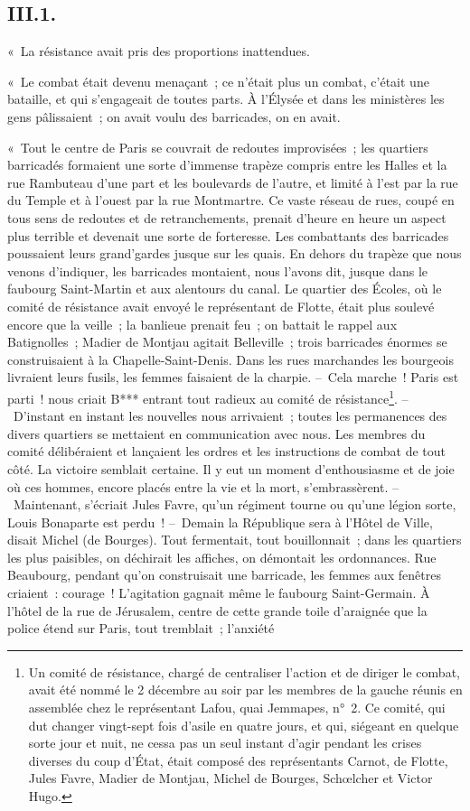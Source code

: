\documentclass[french,twoside]{book} %
\begin{document}
\subsection[{III.1.}]{III.1.}
\noindent « La résistance avait pris des proportions inattendues.\par
« Le combat était devenu menaçant ; ce n’était plus un combat, c’était une bataille, et qui s’engageait de toutes parts. À l’Élysée et dans les ministères les gens pâlissaient ; on avait voulu des barricades, on en avait.\par
« Tout le centre de Paris se couvrait de redoutes improvisées ; les quartiers barricadés formaient une sorte d’immense trapèze compris entre les Halles et la rue Rambuteau d’une part et les boulevards de l’autre, et limité à l’est par la rue du Temple et à l’ouest par la rue Montmartre. Ce vaste réseau de rues, coupé en tous sens de redoutes et de retranchements, prenait d’heure en heure un aspect plus terrible et devenait une sorte de forteresse. Les combattants des barricades poussaient leurs grand’gardes jusque sur les quais. En dehors du trapèze que nous venons d’indiquer, les barricades montaient, nous l’avons dit, jusque dans le faubourg Saint-Martin et aux alentours du canal. Le quartier des Écoles, où le comité de résistance avait envoyé le représentant de Flotte, était plus soulevé encore que la veille ; la banlieue prenait feu ; on battait le rappel aux Batignolles ; Madier de Montjau agitait Belleville ; trois barricades énormes se construisaient à la Chapelle-Saint-Denis. Dans les rues marchandes les bourgeois livraient leurs fusils, les femmes faisaient de la charpie. – Cela marche ! Paris est parti ! nous criait B*** entrant tout radieux au comité de résistance\footnote{Un comité de résistance, chargé de centraliser l’action et de diriger le combat, avait été nommé le 2 décembre au soir par les membres de la gauche réunis en assemblée chez le représentant Lafou, quai Jemmapes, n° 2. Ce comité, qui dut changer vingt-sept fois d’asile en quatre jours, et qui, siégeant en quelque sorte jour et nuit, ne cessa pas un seul instant d’agir pendant les crises diverses du coup d’État, était composé des représentants Carnot, de Flotte, Jules Favre, Madier de Montjau, Michel de Bourges, Schœlcher et Victor Hugo.}. – D’instant en instant les nouvelles nous arrivaient ; toutes les permanences des divers quartiers se mettaient en communication avec nous. Les membres du comité délibéraient et lançaient les ordres et les instructions de combat de tout côté. La victoire semblait certaine. Il y eut un moment d’enthousiasme et de joie où ces hommes, encore placés entre la vie et la mort, s’embrassèrent. – Maintenant, s’écriait Jules Favre, qu’un régiment tourne ou qu’une légion sorte, Louis Bonaparte est perdu ! – Demain la République sera à l’Hôtel de Ville, disait Michel (de Bourges). Tout fermentait, tout bouillonnait ; dans les quartiers les plus paisibles, on déchirait les affiches, on démontait les ordonnances. Rue Beaubourg, pendant qu’on construisait une barricade, les femmes aux fenêtres criaient : courage ! L’agitation gagnait même le faubourg Saint-Germain. À l’hôtel de la rue de Jérusalem, centre de cette grande toile d’araignée que la police étend sur Paris, tout tremblait ; l’anxiété 
\end{document}
